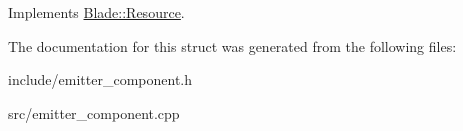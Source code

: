 Implements \hyperlink{class_blade_1_1_resource_ad89ab00a3b81df1338a8310ec92c5cff}{Blade\+::\+Resource}.



The documentation for this struct was generated from the following files\+:\begin{DoxyCompactItemize}
\item 
include/emitter\+\_\+component.\+h\item 
src/emitter\+\_\+component.\+cpp\end{DoxyCompactItemize}
